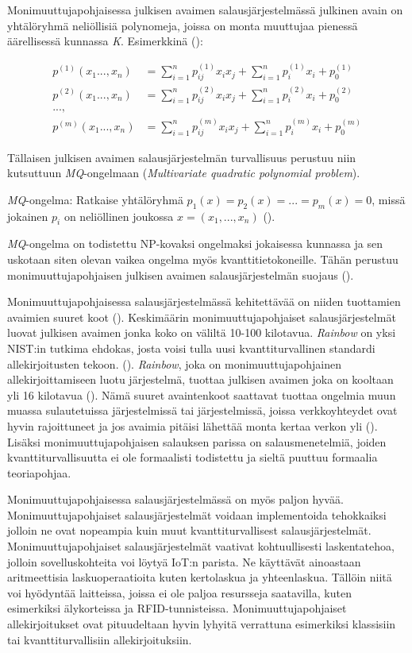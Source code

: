 Monimuuttujapohjaisessa julkisen avaimen salausjärjestelmässä julkinen avain on yhtälöryhmä neliöllisiä polynomeja, joissa on monta muuttujaa pienessä äärellisessä kunnassa \emph{K}. Esimerkkinä (\cite{8012305}): 

    \begin{align*}
        p^{(1)}(x_{1}...,x_{n}) &= \sum_{i=1}^{n} p_{ij}^{(1)}x_{i}x_ {j}+\sum_{i=1}^{n}p_ {i}^{(1)}x_{i}+p_ {0}^{(1)} \\
        p^{(2)}(x_{1}...,x_{n}) &= \sum_{i=1}^{n} p_{ij}^{(2)}x_{i}x_ {j}+\sum_{i=1}^{n}p_ {i}^{(2)}x_{i}+p_ {0}^{(2)} \\
        ..., \\
        p^{(m)}(x_{1}...,x_{n}) &= \sum_{i=1}^{n} p_{ij}^{(m)}x_{i}x_ {j}+\sum_{i=1}^{n}p_ {i}^{(m)}x_{i}+p_ {0}^{(m)}
    \end{align*}
    
Tällaisen julkisen avaimen salausjärjestelmän turvallisuus perustuu niin kutsuttuun \emph{MQ}-ongelmaan (\emph{Multivariate quadratic polynomial problem}).

\emph{MQ}-ongelma: Ratkaise yhtälöryhmä $p_{1}(x) = p_{2}(x) = ... = p_ {m}(x) = 0$, missä jokainen $p_{i}$ on neliöllinen joukossa $x = (x_{1}, ..., x_{n})$ (\cite{Ding2009}).

\emph{MQ}-ongelma on todistettu NP-kovaksi ongelmaksi jokaisessa kunnassa ja sen uskotaan siten olevan vaikea ongelma myös kvanttitietokoneille. Tähän perustuu monimuuttujapohjaisen julkisen avaimen salausjärjestelmän suojaus (\cite{8012305}).

Monimuuttujapohjaisessa salausjärjestelmässä kehitettävää on niiden tuottamien avaimien suuret koot (\cite{8012305}). Keskimäärin monimuuttujapohjaiset salausjärjestelmät luovat julkisen avaimen jonka koko on väliltä 10-100 kilotavua. \emph{Rainbow} on yksi NIST:in tutkima ehdokas, josta voisi tulla uusi kvanttiturvallinen standardi allekirjoitusten tekoon. (\cite{alagic2020status}). \emph{Rainbow}, joka on monimuuttujapohjainen allekirjoittamiseen luotu järjestelmä, tuottaa julkisen avaimen joka on kooltaan yli 16 kilotavua (\cite{Ding2009}). Nämä suuret avaintenkoot saattavat tuottaa ongelmia muun muassa sulautetuissa järjestelmissä tai järjestelmissä, joissa verkkoyhteydet ovat hyvin rajoittuneet ja jos avaimia pitäisi lähettää monta kertaa verkon yli (\cite{8012305}). Lisäksi monimuuttujapohjaisen salauksen parissa on salausmenetelmiä, joiden kvanttiturvallisuutta ei ole formaalisti todistettu ja sieltä puuttuu formaalia teoriapohjaa.

Monimuuttujapohjaisessa salausjärjestelmässä on myös paljon hyvää. Monimuuttujapohjaiset salausjärjestelmät voidaan implementoida tehokkaiksi jolloin ne ovat nopeampia kuin muut kvanttiturvallisest salausjärjestelmät. Monimuuttujapohjaiset salausjärjestelmät vaativat kohtuullisesti laskentatehoa, jolloin sovelluskohteita voi löytyä IoT:n parista. Ne käyttävät ainoastaan aritmeettisia laskuoperaatioita kuten kertolaskua ja yhteenlaskua. Tällöin niitä voi hyödyntää laitteissa, joissa ei ole paljoa resursseja saatavilla, kuten esimerkiksi älykorteissa ja RFID-tunnisteissa. Monimuuttujapohjaiset allekirjoitukset ovat pituudeltaan hyvin lyhyitä verrattuna esimerkiksi klassisiin tai kvanttiturvallisiin allekirjoituksiin.